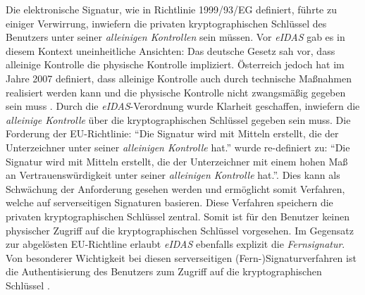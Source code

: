 \documentclass[11pt,a4paper,ngerman]{scrreprt}
\begin{document}
Die elektronische Signatur, wie in Richtlinie 1999/93/EG definiert, führte zu einiger Verwirrung, inwiefern die privaten kryptographischen Schlüssel des Benutzers unter seiner \emph{alleinigen Kontrollen} sein müssen. Vor \emph{eIDAS} gab es in diesem Kontext uneinheitliche Ansichten: Das deutsche Gesetz sah vor, dass alleinige Kontrolle die physische Kontrolle impliziert. Österreich jedoch hat im Jahre 2007 definiert, dass alleinige Kontrolle auch durch technische Maßnahmen realisiert werden kann und die physische Kontrolle nicht zwangsmäßig gegeben sein muss \cite[S.\,220]{scWorkshop}. Durch die \textit{eIDAS}-Verordnung wurde Klarheit geschaffen, inwiefern die \emph{alleinige Kontrolle} über die kryptographischen Schlüssel gegeben sein muss. Die Forderung der EU-Richtlinie: ``Die Signatur wird mit Mitteln erstellt, die der Unterzeichner unter seiner \emph{alleinigen Kontrolle} hat.'' wurde re-definiert zu: ``Die Signatur wird mit Mitteln erstellt, die der Unterzeichner mit einem hohen Maß an Vertrauenswürdigkeit unter seiner \emph{alleinigen Kontrolle} hat.''\cite[S.\,221]{scWorkshop}. Dies kann als Schwächung der Anforderung gesehen werden und ermöglicht somit Verfahren, welche auf serverseitigen Signaturen basieren. Diese Verfahren speichern die privaten kryptographischen Schlüssel zentral. Somit ist für den Benutzer keinen physischer Zugriff auf die kryptographischen Schlüssel vorgesehen. Im Gegensatz zur abgelösten EU-Richtline erlaubt \textit{eIDAS} ebenfalls explizit die \emph{Fernsignatur}. Von besonderer Wichtigkeit bei diesen serverseitigen (Fern-)Signaturverfahren ist die Authentisierung des Benutzers zum Zugriff auf die kryptographischen Schlüssel \cite[223]{scWorkshop}. 
\end{document}
